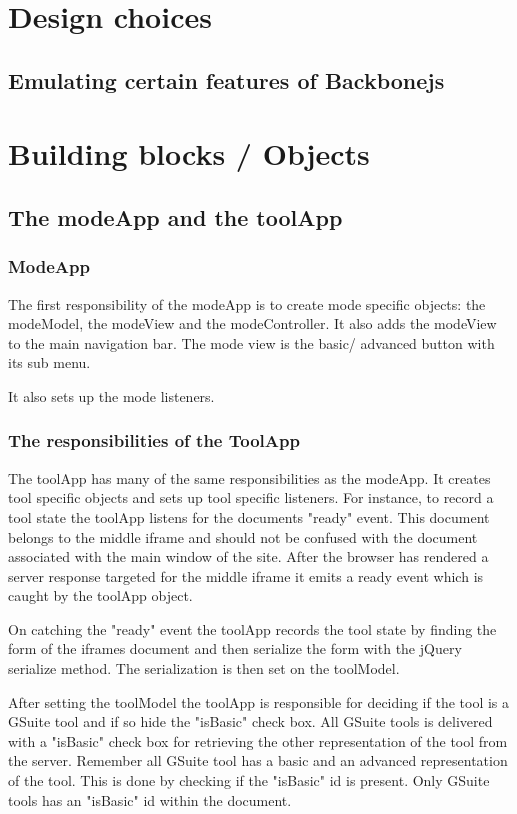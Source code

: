 \documentclass[english]{ifimaster}
\begin{document}
\section{Design choices}
\subsection{Emulating certain features of Backbonejs}
\section{Building blocks / Objects}
\subsection{The modeApp and the toolApp}
\subsubsection{ModeApp}
The first responsibility of the modeApp is to create mode specific objects: the modeModel, the modeView and the modeController. It also adds the modeView to the main navigation bar. The mode view is the basic/ advanced button with its sub menu.

It also sets up the mode listeners. 

\subsubsection{The responsibilities of the ToolApp}
The toolApp has many of the same responsibilities as the modeApp. It creates tool specific objects and sets up tool specific listeners. For instance, to record a tool state the toolApp listens for the documents "ready" event. This document belongs to the middle iframe and should not be confused with the document associated with the main window of the site. After the browser has rendered a server response targeted for the middle iframe it emits a ready event which is caught by the toolApp object. 

On catching the "ready" event the toolApp records the tool state by finding the form of the iframes document and then serialize the form with the jQuery serialize method. The serialization is then set on the toolModel.

After setting the toolModel the toolApp is responsible for deciding if the tool is a GSuite tool and if so hide the "isBasic" check box. All GSuite tools is delivered with a "isBasic" check box for retrieving the other representation of the tool from the server. Remember all GSuite tool has a basic and an advanced representation of the tool. This is done by checking if the "isBasic" id is present. Only GSuite tools has an "isBasic" id within the document. 
\end{document}
